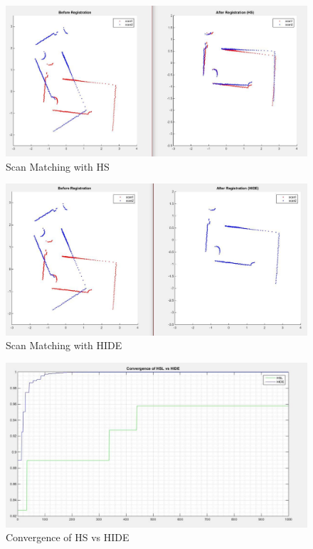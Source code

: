\documentclass[letterpaper, 10 pt, conference]{ieeeconf}  %
\begin{document}
\begin{figure}[H]
  \includegraphics[width=\linewidth]{shs.jpg}
  \caption{Scan Matching with HS}
  \label{fig:dataset}
\end{figure}

\begin{figure}[H]
  \includegraphics[width=\linewidth]{shide.jpg}
  \caption{Scan Matching with HIDE}
  \label{fig:dataset}
\end{figure}

\begin{figure}[H]
  \includegraphics[width=\linewidth]{conv.jpg}
  \caption{Convergence of HS vs HIDE}
  \label{fig:dataset}
\end{figure}
\end{document}
